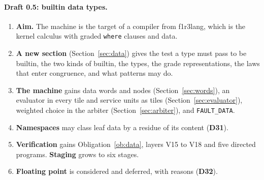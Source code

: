 \documentclass[11pt]{article}
\newcommand{\kw}[1]{\texttt{#1}}
\newcommand{\dec}[1]{\textbf{D#1}}
\theoremstyle{definition}
\theoremstyle{remark}
\begin{document}
\paragraph{Draft 0.5: builtin data types.}
\begin{enumerate}
\item \textbf{Aim.} The machine is the target of a compiler from f1r3lang,
which is the kernel calculus with graded \kw{where} clauses and data.
\item \textbf{A new section} (Section~\ref{sec:data}) gives the test a type
must pass to be builtin, the two kinds of builtin, the types, the grade
representations, the laws that enter congruence, and what patterns may do.
\item \textbf{The machine} gains data words and nodes
(Section~\ref{sec:words}), an evaluator in every tile and service units as
tiles (Section~\ref{sec:evaluator}), weighted choice in the arbiter
(Section~\ref{sec:arbiter}), and \kw{FAULT\_DATA}.
\item \textbf{Namespaces} may class leaf data by a residue of its content
(\dec{31}).
\item \textbf{Verification} gains Obligation~\ref{ob:data}, layers V15 to
V18 and five directed programs. \textbf{Staging} grows to six stages.
\item \textbf{Floating point} is considered and deferred, with reasons
(\dec{32}).
\end{enumerate}
\end{document}
